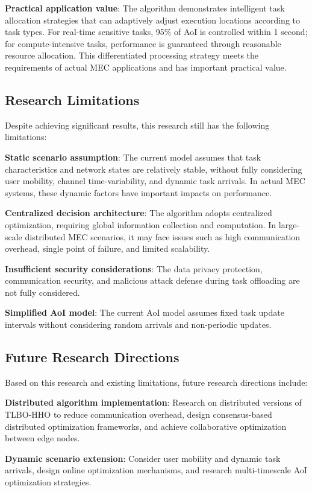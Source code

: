 \documentclass[conference]{IEEEtran}
\begin{document}
\textbf{Practical application value}: The algorithm demonstrates intelligent task allocation strategies that can adaptively adjust execution locations according to task types. For real-time sensitive tasks, 95\% of AoI is controlled within 1 second; for compute-intensive tasks, performance is guaranteed through reasonable resource allocation. This differentiated processing strategy meets the requirements of actual MEC applications and has important practical value.

\subsection{Research Limitations}
Despite achieving significant results, this research still has the following limitations:

\textbf{Static scenario assumption}: The current model assumes that task characteristics and network states are relatively stable, without fully considering user mobility, channel time-variability, and dynamic task arrivals. In actual MEC systems, these dynamic factors have important impacts on performance.

\textbf{Centralized decision architecture}: The algorithm adopts centralized optimization, requiring global information collection and computation. In large-scale distributed MEC scenarios, it may face issues such as high communication overhead, single point of failure, and limited scalability.

\textbf{Insufficient security considerations}: The data privacy protection, communication security, and malicious attack defense during task offloading are not fully considered.

\textbf{Simplified AoI model}: The current AoI model assumes fixed task update intervals without considering random arrivals and non-periodic updates.

\subsection{Future Research Directions}
Based on this research and existing limitations, future research directions include:

\textbf{Distributed algorithm implementation}: Research on distributed versions of TLBO-HHO to reduce communication overhead, design consensus-based distributed optimization frameworks, and achieve collaborative optimization between edge nodes.

\textbf{Dynamic scenario extension}: Consider user mobility and dynamic task arrivals, design online optimization mechanisms, and research multi-timescale AoI optimization strategies.
\end{document}

